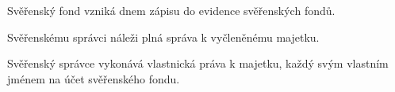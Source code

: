 \documentclass[parskip=half]{scrreprt}
\begin{document}
\begin{contract}

Svěřenský fond vzniká dnem zápisu do evidence svěřenských fondů.




Svěřenskému správci náleži plná správa k vyčleněnému majetku.

Svěřenský správce vykonává vlastnická práva k majetku, každý svým vlastním jménem na účet svěřenského fondu.








\end{contract}
\end{document}
